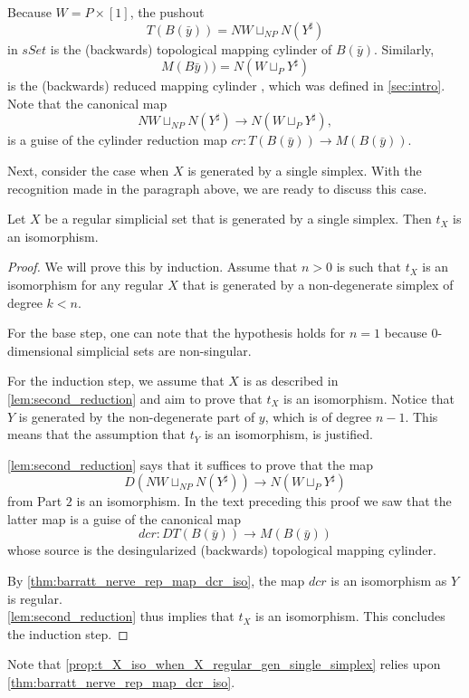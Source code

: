 Because $W=P\times [1]$, the pushout
\[T(B(\bar{y} ))=NW\sqcup _{NP}N(Y^\sharp )\]
in $sSet$ is the (backwards) topological mapping cylinder of $B(\bar{y} )$. Similarly,
\[M(B\bar{y} ))=N(W\sqcup _PY^\sharp )\]
is the (backwards) reduced mapping cylinder \cite[pp.~56--68]{WJR13}, which was defined in \cref{sec:intro}. Note that the canonical map
\[NW\sqcup _{NP}N(Y^\sharp )\to N(W\sqcup _PY^\sharp ),\]
is a guise of the cylinder reduction map $cr:T(B(\bar{y} ))\to M(B(\bar{y} ))$.

Next, consider the case when $X$ is generated by a single simplex. With the recognition made in the paragraph above, we are ready to discuss this case.
\begin{proposition}
\label{prop:t_X_iso_when_X_regular_gen_single_simplex}
Let $X$ be a regular simplicial set that is generated by a single simplex. Then $t_X$ is an isomorphism.
\end{proposition}
\begin{proof}
We will prove this by induction. Assume that $n>0$ is such that $t_X$ is an isomorphism for any regular $X$ that is generated by a non-degenerate simplex of degree $k<n$.

For the base step, one can note that the hypothesis holds for $n=1$ because $0$-dimensional simplicial sets are non-singular.

For the induction step, we assume that $X$ is as described in \cref{lem:second_reduction} and aim to prove that $t_X$ is an isomorphism. Notice that $Y$ is generated by the non-degenerate part of $y$, which is of degree $n-1$. This means that the assumption that $t_Y$ is an isomorphism, is justified.

\cref{lem:second_reduction} says that it suffices to prove that the map
\[D(NW\sqcup _{NP}N(Y^\sharp ))\to N(W\sqcup _PY^\sharp )\]
from Part $2$ is an isomorphism. In the text preceding this proof we saw that the latter map is a guise of the canonical map
\[dcr:DT(B(\bar{y} ))\to M(B(\bar{y} ))\]
whose source is the desingularized (backwards) topological mapping cylinder.

By \cref{thm:barratt_nerve_rep_map_dcr_iso}, the map $dcr$ is an isomorphism as $Y$ is regular.\\ \cref{lem:second_reduction} thus implies that $t_X$ is an isomorphism. This concludes the induction step.
\end{proof}
\noindent Note that \cref{prop:t_X_iso_when_X_regular_gen_single_simplex} relies upon \cref{thm:barratt_nerve_rep_map_dcr_iso}.


